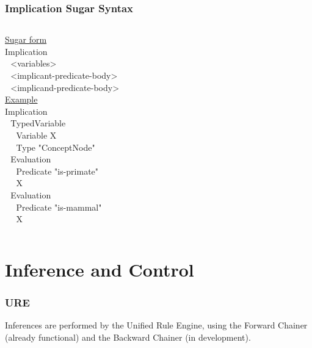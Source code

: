 \documentclass{beamer}
\begin{document}
\frame
{
  \frametitle{Implication Sugar Syntax}

  {\tiny

  \begin{columns}
    \column{2in}
    \underline{Sugar form}\\[.2cm]
    Implication\\
    $\ \ \ $<variables>\\
    $\ \ \ $<implicant-predicate-body>\\
    $\ \ \ $<implicand-predicate-body>\\
    \column{2in}
    \underline{Example}\\[.2cm]
    Implication\\
    $\ \ \ $TypedVariable\\
    $\ \ \ $$\ \ \ $Variable X\\
    $\ \ \ $$\ \ \ $Type "ConceptNode"\\
    $\ \ \ $Evaluation\\
    $\ \ \ $$\ \ \ $Predicate "is-primate"\\
    $\ \ \ $$\ \ \ $X\\
    $\ \ \ $Evaluation\\
    $\ \ \ $$\ \ \ $Predicate "is-mammal"\\
    $\ \ \ $$\ \ \ $X\\
  \end{columns}

  }
}

\iffalse

\section{Inference and Control}

\frame
{

  \frametitle{URE}

  Inferences are performed by the \alert{Unified Rule Engine}, using
  the \alert{Forward Chainer} (already functional) and the
  \alert{Backward Chainer} (in development).\\[1cm]

}
\end{document}

